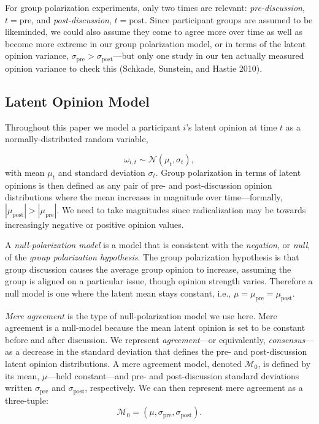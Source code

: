 \documentclass[preview]{article}
\newcommand{\sigmapre}{\sigma_\mathrm{pre}}
\newcommand{\sigmapost}{\sigma_\mathrm{post}}
\newcommand{\nullmodel}{\mathcal{M}_0}
\begin{document}
For group polarization experiments, only two times are relevant:
\emph{pre-discussion}, $t=\mathrm{pre}$, and \emph{post-discussion},
$t=\mathrm{post}$. Since participant groups are assumed to be
likeminded, we could also assume they come to agree more over time as
well as become more extreme in our group polarization model, or in terms
of the latent opinion variance,
$\sigma_\mathrm{pre}> \sigma_\mathrm{post}$---but only one study in
our ten actually measured opinion variance to check this (Schkade,
Sunstein, and Hastie 2010).

\subsection{Latent Opinion Model}\label{latent-opinion-model}

Throughout this paper we model a participant $i$'s latent opinion at
time $t$ as a normally-distributed random variable,

\begin{equation}
  \omega_{i,t} \sim
  \mathcal{N}(\mu_t, \sigma_t),
\label{eq:normal-opinion-distribution}
\end{equation} 
\noindent
with mean $\mu_t$ and standard deviation $\sigma_t$.
Group polarization in terms of latent opinions is then defined as any
pair of pre- and post-discussion opinion distributions where the mean
increases in magnitude over time---formally,
$| \mu_\mathrm{post}| > | \mu_\mathrm{pre}|$. We need to take
magnitudes since radicalization may be towards increasingly negative or
positive opinion values.

A \emph{null-polarization model} is a model that is consistent with the
\emph{negation}, or \emph{null}, of the \emph{group polarization
hypothesis}. The group polarization hypothesis is that group discussion
causes the average group opinion to increase, assuming the group is
aligned on a particular issue, though opinion strength varies. Therefore
a null model is one where the latent mean stays constant, i.e.,
$\mu = \mu_\mathrm{pre} = \mu_\mathrm{post}$.

\emph{Mere agreement} is the type of null-polarization model we use
here. Mere agreement is a null-model because the mean latent opinion is
set to be constant before and after discussion. We represent
\emph{agreement}---or equivalently, \emph{consensus}---as a decrease in
the standard deviation that defines the pre- and post-discussion latent
opinion distributions. A mere agreement model, denoted $\nullmodel$, is
defined by its mean, $\mu$—held constant—and pre- and post-discussion standard
deviations written $\sigmapre$ and $\sigmapost$, respectively. We 
can then represent mere agreement as a three-tuple:
\begin{equation}
  \nullmodel = (\mu, \sigmapre, \sigmapost).
  \label{eq:nullmodel-tuple}
\end{equation}
\noindent
\end{document}
